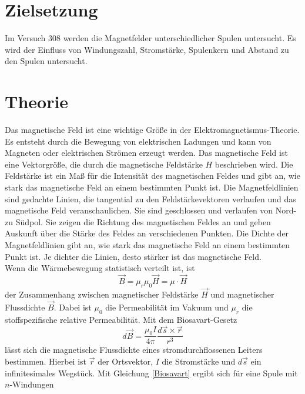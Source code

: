 \section{Zielsetzung}
\label{sec:Zielsetzung}

Im Versuch 308 werden die Magnetfelder unterschiedlicher Spulen untersucht. Es wird der Einfluss von Windungszahl, 
Stromstärke, Spulenkern und Abstand zu den Spulen untersucht.\\

\section{Theorie}
\label{sec:Theorie}
Das magnetische Feld ist eine wichtige Größe in der Elektromagnetismus-Theorie. 
Es entsteht durch die Bewegung von elektrischen Ladungen und kann von Magneten oder elektrischen Strömen erzeugt werden.
Das magnetische Feld ist eine Vektorgröße, die durch die magnetische Feldstärke $H$ beschrieben wird. 
Die Feldstärke ist ein Maß für die Intensität des magnetischen Feldes und gibt an, wie stark das magnetische Feld an einem bestimmten Punkt ist. 
Die Magnetfeldlinien sind gedachte Linien, die tangential zu den Feldstärkevektoren verlaufen und das magnetische Feld veranschaulichen. 
Sie sind geschlossen und verlaufen von Nord- zu Südpol. Sie zeigen die Richtung des magnetischen Feldes an und geben Auskunft über die Stärke des Feldes an verschiedenen Punkten. 
Die Dichte der Magnetfeldlinien gibt an, wie stark das magnetische Feld an einem bestimmten Punkt ist. Je dichter die Linien, desto stärker ist das magnetische Feld.
\\
Wenn die Wärmebewegung statistisch verteilt ist, ist
\begin{equation}\label{eq:BmuH}
    \vec{B} = \mu_r \mu_0 \vec{H} = μ \cdot \vec{H}
\end{equation}
der Zusammenhang zwischen magnetischer Feldstärke $\vec{H}$ und magnetischer Flussdichte $\vec{B}$. Dabei ist $\mu_0$ die Permeabilität im Vakuum und $\mu_r$ die
stoffspezifische relative Permeabilität.
Mit dem Biosavart-Gesetz 
\begin{equation}\label{Biosavart}
    d\vec{B} = \frac{μ_0I}{4π} \frac{d\vec{s} \times \vec{r}}{r^3}
\end{equation}
lässt sich die magnetische Flussdichte eines stromdurchflossenen Leiters bestimmen. Hierbei ist $\vec{r}$ der Ortsvektor, $I$ die Stromstärke und $d\vec{s}$ ein 
infinitesimales Wegstück. 
Mit Gleichung \eqref{Biosavart} ergibt sich für eine Spule mit $n$-Windungen 
